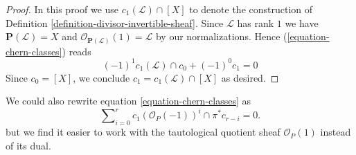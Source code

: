 \begin{proof}
In this proof we use $c_1(\mathcal{L}) \cap [X]$ to denote the
construction of Definition \ref{definition-divisor-invertible-sheaf}.
Since $\mathcal{L}$ has rank $1$ we have
$\mathbf{P}(\mathcal{L}) = X$ and
$\mathcal{O}_{\mathbf{P}(\mathcal{L})}(1) = \mathcal{L}$
by our normalizations. Hence (\ref{equation-chern-classes})
reads
$$
(-1)^1 c_1(\mathcal{L}) \cap c_0 + (-1)^0 c_1 = 0
$$
Since $c_0 = [X]$, we conclude $c_1 = c_1(\mathcal{L}) \cap [X]$
as desired.
\end{proof}

\begin{remark}
\label{remark-equation-signs}
We could also rewrite equation \ref{equation-chern-classes} as
\begin{equation}
\label{equation-signs}
\sum\nolimits_{i = 0}^r
c_1(\mathcal{O}_P(-1))^i \cap \pi^*c_{r - i}
= 0.
\end{equation}
but we find it easier to work with the tautological quotient
sheaf $\mathcal{O}_P(1)$ instead of
its dual.
\end{remark}




